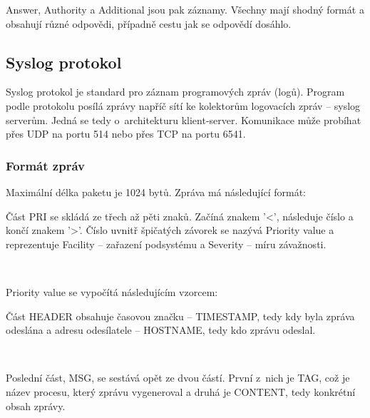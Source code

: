 \documentclass[11pt, a4paper, titlepage]{article}
\begin{document}
Answer, Authority a Additional jsou pak záznamy. Všechny mají shodný formát a obsahují různé odpovědi, případně cestu jak se odpovědí dosáhlo.

\subsection{Syslog protokol}

Syslog protokol je standard pro záznam programových zpráv (logů). Program podle protokolu posílá zprávy napříč sítí ke kolektorům logovacích zpráv -- syslog serverům. Jedná se tedy o~architekturu klient-server. Komunikace může probíhat přes UDP na portu 514 nebo přes TCP na portu 6541.

\subsubsection{Formát zpráv}

Maximální délka paketu je 1024 bytů. Zpráva má následující formát:

\begin{center}
\end{center}

Část PRI se skládá ze třech až pěti znaků. Začíná znakem '<', následuje číslo a končí znakem '>'. Číslo uvnitř špičatých závorek se nazývá Priority value a reprezentuje Facility -- zařazení podsystému a Severity -- míru závažnosti.

\begin{center}
	 \\
\end{center}

Priority value se vypočítá následujícím vzorcem:

\begin{center}
\end{center}

Část HEADER obsahuje časovou značku -- TIMESTAMP, tedy kdy byla zpráva odeslána a adresu odesílatele -- HOSTNAME, tedy kdo zprávu odeslal.

\begin{center}
	 \\
\end{center}

Poslední část, MSG, se sestává opět ze dvou částí. První z~nich je TAG, což je název procesu, který zprávu vygeneroval a druhá je CONTENT, tedy konkrétní obsah zprávy.
\end{document}
